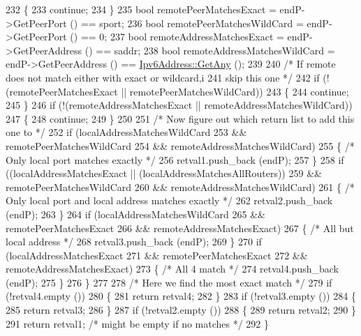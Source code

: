 \begin{DoxyCode}
232         \{
233           \textcolor{keywordflow}{continue};
234         \}
235       \textcolor{keywordtype}{bool} remotePeerMatchesExact = endP->GetPeerPort () == sport;
236       \textcolor{keywordtype}{bool} remotePeerMatchesWildCard = endP->GetPeerPort () == 0;
237       \textcolor{keywordtype}{bool} remoteAddressMatchesExact = endP->GetPeerAddress () == saddr;
238       \textcolor{keywordtype}{bool} remoteAddressMatchesWildCard = endP->GetPeerAddress () == 
      \hyperlink{classns3_1_1Ipv6Address_a2783e8badfc98c8b0a8508bba6e1b91e}{Ipv6Address::GetAny} ();
239 
240       \textcolor{comment}{/* If remote does not match either with exact or wildcard,i}
241 \textcolor{comment}{         skip this one */}
242       \textcolor{keywordflow}{if} (!(remotePeerMatchesExact || remotePeerMatchesWildCard))
243         \{
244           \textcolor{keywordflow}{continue};
245         \}
246       \textcolor{keywordflow}{if} (!(remoteAddressMatchesExact || remoteAddressMatchesWildCard))
247         \{
248           \textcolor{keywordflow}{continue};
249         \}
250 
251       \textcolor{comment}{/* Now figure out which return list to add this one to */}
252       \textcolor{keywordflow}{if} (localAddressMatchesWildCard
253           && remotePeerMatchesWildCard
254           && remoteAddressMatchesWildCard)
255         \{ \textcolor{comment}{/* Only local port matches exactly */}
256           retval1.push\_back (endP);
257         \}
258       \textcolor{keywordflow}{if} ((localAddressMatchesExact || (localAddressMatchesAllRouters))
259           && remotePeerMatchesWildCard
260           && remoteAddressMatchesWildCard)
261         \{ \textcolor{comment}{/* Only local port and local address matches exactly */}
262           retval2.push\_back (endP);
263         \}
264       \textcolor{keywordflow}{if} (localAddressMatchesWildCard
265           && remotePeerMatchesExact
266           && remoteAddressMatchesExact)
267         \{ \textcolor{comment}{/* All but local address */}
268           retval3.push\_back (endP);
269         \}
270       \textcolor{keywordflow}{if} (localAddressMatchesExact
271           && remotePeerMatchesExact
272           && remoteAddressMatchesExact)
273         \{ \textcolor{comment}{/* All 4 match */}
274           retval4.push\_back (endP);
275         \}
276     \}
277 
278   \textcolor{comment}{/* Here we find the most exact match */}
279   \textcolor{keywordflow}{if} (!retval4.empty ())
280     \{
281       \textcolor{keywordflow}{return} retval4;
282     \}
283   \textcolor{keywordflow}{if} (!retval3.empty ())
284     \{
285       \textcolor{keywordflow}{return} retval3;
286     \}
287   \textcolor{keywordflow}{if} (!retval2.empty ())
288     \{
289       \textcolor{keywordflow}{return} retval2;
290     \}
291   \textcolor{keywordflow}{return} retval1;  \textcolor{comment}{/* might be empty if no matches */}
292 \}
\end{DoxyCode}


